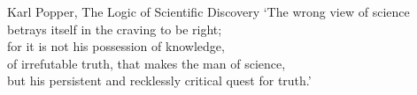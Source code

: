 \documentclass{Latex/Classes/GenThesis}
\begin{document}


\fancyend

\thispagestyle{empty}
\newpage

\vspace*{3cm} 

\begin{pquotation}{Karl Popper, The Logic of Scientific Discovery}
	`The wrong view of science\\
	 betrays itself in the craving to be right;\\ 
	for it is not his possession of knowledge,\\ 
	of irrefutable truth, that makes the man of science, \\
	but his persistent and recklessly critical quest for truth.'\\
	\newline
\end{pquotation}

%
\fancyend

\fancyend

{}
{}


\fancyend

{}
{}
\setcounter{secnumdepth}{3} %
\setcounter{tocdepth}{3}    %
\tableofcontents            %
\fancyend





%  
\end{document}
